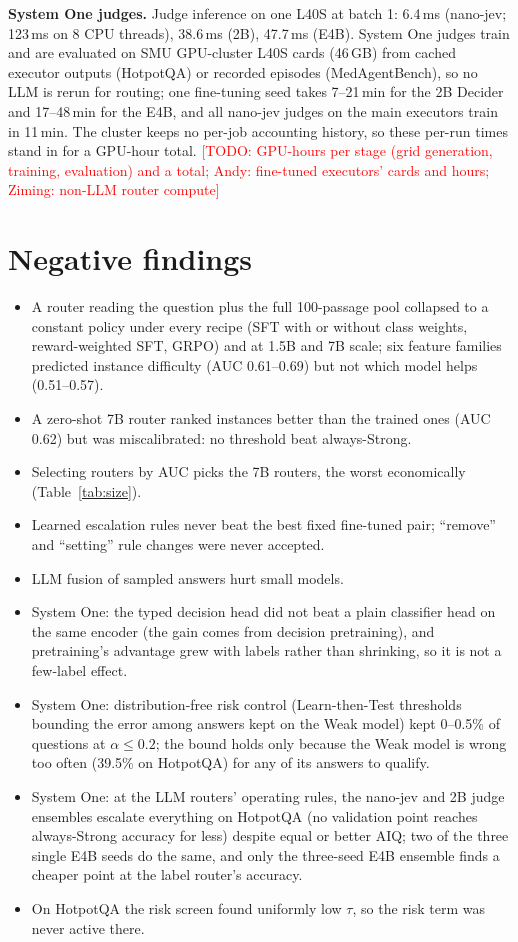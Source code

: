 \documentclass{article}
\newif\ifshowtodos \showtodostrue
\newcommand{\todo}[1]{\ifshowtodos\textcolor{red}{\textsf{\small[TODO: #1]}}\fi}
\begin{document}
\textbf{System One judges.} Judge inference on one L40S at batch 1: 6.4\,ms (nano-jev; 123\,ms on 8 CPU threads), 38.6\,ms (2B), 47.7\,ms (E4B). System One judges train and are evaluated on SMU GPU-cluster L40S cards (46\,GB) from cached executor outputs (HotpotQA) or recorded episodes (MedAgentBench), so no LLM is rerun for routing; one fine-tuning seed takes 7--21\,min for the 2B Decider and 17--48\,min for the E4B, and all nano-jev judges on the main executors train in 11\,min. The cluster keeps no per-job accounting history, so these per-run times stand in for a GPU-hour total. \todo{GPU-hours per stage (grid generation, training, evaluation) and a total; Andy: fine-tuned executors' cards and hours; Ziming: non-LLM router compute}

\section{Negative findings}
\label{app:negative}
\begin{itemize}
\item A router reading the question plus the full 100-passage pool collapsed to a constant policy under every recipe (SFT with or without class weights, reward-weighted SFT, GRPO) and at 1.5B and 7B scale; six feature families predicted instance difficulty (AUC 0.61--0.69) but not which model helps (0.51--0.57).
\item A zero-shot 7B router ranked instances better than the trained ones (AUC 0.62) but was miscalibrated: no threshold beat always-Strong.
\item Selecting routers by AUC picks the 7B routers, the worst economically (Table~\ref{tab:size}).
\item Learned escalation rules never beat the best fixed fine-tuned pair; ``remove'' and ``setting'' rule changes were never accepted.
\item LLM fusion of sampled answers hurt small models.
\item System One: the typed decision head did not beat a plain classifier head on the same encoder (the gain comes from decision pretraining), and pretraining's advantage grew with labels rather than shrinking, so it is not a few-label effect.
\item System One: distribution-free risk control (Learn-then-Test thresholds \citep{angelopoulos2021ltt} bounding the error among answers kept on the Weak model) kept 0--0.5\% of questions at $\alpha\le0.2$; the bound holds only because the Weak model is wrong too often (39.5\% on HotpotQA) for any of its answers to qualify.
\item System One: at the LLM routers' operating rules, the nano-jev and 2B judge ensembles escalate everything on HotpotQA (no validation point reaches always-Strong accuracy for less) despite equal or better AIQ; two of the three single E4B seeds do the same, and only the three-seed E4B ensemble finds a cheaper point at the label router's accuracy.
\item On HotpotQA the risk screen found uniformly low $\tau$, so the risk term was never active there.
\end{itemize}
\end{document}
